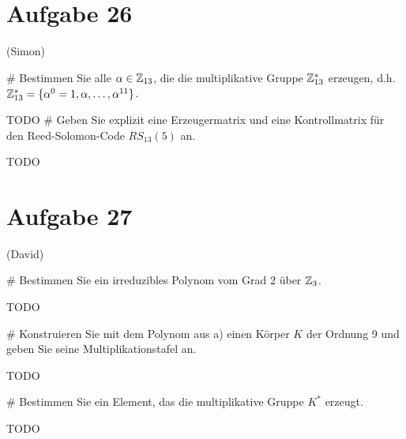 \section*{Aufgabe 26}
(Simon)
\begin{myList}
#
Bestimmen Sie alle $\alpha \in \mathbb{Z}_{13}$, die die multiplikative Gruppe $\mathbb{Z}_{13}^{\ast}$ erzeugen, d.h. $\mathbb{Z}_{13}^{\ast} = \lbrace \alpha^0 = 1,\alpha,\ldots,\alpha^{11} \rbrace$.
\medskip

TODO
#
Geben Sie explizit eine Erzeugermatrix und eine Kontrollmatrix für den Reed-Solomon-Code $RS_{13}(5)$ an.\medskip

TODO
\end{myList}

\section*{Aufgabe 27}
(David)
\begin{myList}
#
Bestimmen Sie ein irreduzibles Polynom vom Grad 2 über $\mathbb{Z}_3$.\medskip

TODO

#
Konstruieren Sie mit dem Polynom aus a) einen Körper $K$ der Ordnung 9 und geben Sie seine Multiplikationstafel an.\medskip

TODO

#
Bestimmen Sie ein Element, das die multiplikative Gruppe $K^{\ast}$ erzeugt.\medskip

TODO
\end{myList}

